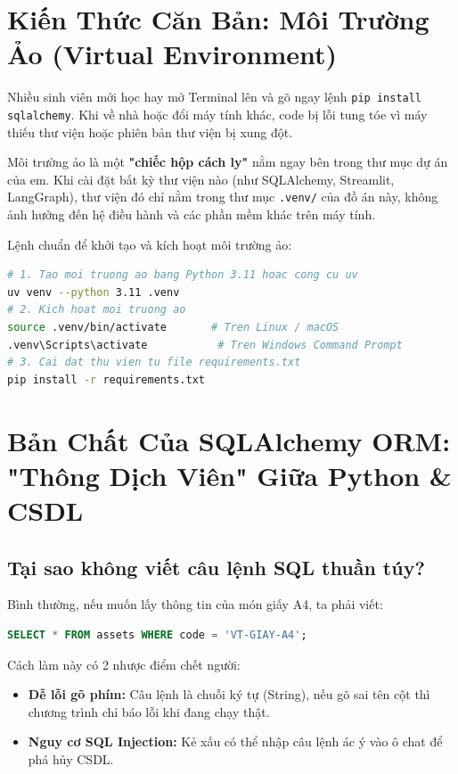 \documentclass[11pt,a4paper]{article}
\begin{document}
\section{Kiến Thức Căn Bản: Môi Trường Ảo (Virtual Environment)}

Nhiều sinh viên mới học hay mở Terminal lên và gõ ngay lệnh \texttt{pip install sqlalchemy}. Khi về nhà hoặc đổi máy tính khác, code bị lỗi tung tóe vì máy thiếu thư viện hoặc phiên bản thư viện bị xung đột.

\begin{notebox}
Môi trường ảo là một \textbf{"chiếc hộp cách ly"} nằm ngay bên trong thư mục dự án của em. Khi cài đặt bất kỳ thư viện nào (như SQLAlchemy, Streamlit, LangGraph), thư viện đó chỉ nằm trong thư mục \texttt{.venv/} của đồ án này, không ảnh hưởng đến hệ điều hành và các phần mềm khác trên máy tính.
\end{notebox}

Lệnh chuẩn để khởi tạo và kích hoạt môi trường ảo:
\begin{lstlisting}[language=bash]
# 1. Tao moi truong ao bang Python 3.11 hoac cong cu uv
uv venv --python 3.11 .venv
# 2. Kich hoat moi truong ao
source .venv/bin/activate       # Tren Linux / macOS
.venv\Scripts\activate           # Tren Windows Command Prompt
# 3. Cai dat thu vien tu file requirements.txt
pip install -r requirements.txt
\end{lstlisting}

\section{Bản Chất Của SQLAlchemy ORM: "Thông Dịch Viên" Giữa Python \& CSDL}

\subsection{Tại sao không viết câu lệnh SQL thuần túy?}
Bình thường, nếu muốn lấy thông tin của món giấy A4, ta phải viết:
\begin{lstlisting}[language=SQL]
SELECT * FROM assets WHERE code = 'VT-GIAY-A4';
\end{lstlisting}
Cách làm này có 2 nhược điểm chết người:
\begin{itemize}
    \item \textbf{Dễ lỗi gõ phím:} Câu lệnh là chuỗi ký tự (String), nếu gõ sai tên cột thì chương trình chỉ báo lỗi khi đang chạy thật.
    \item \textbf{Nguy cơ SQL Injection:} Kẻ xấu có thể nhập câu lệnh ác ý vào ô chat để phá hủy CSDL.
\end{itemize}
\end{document}

